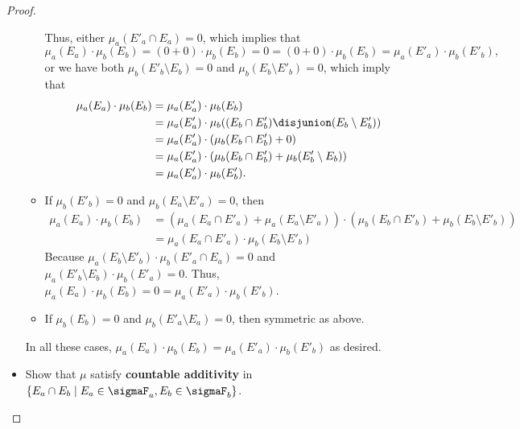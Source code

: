 \documentclass[acmsmall,nonacm,screen,appendix]{acmart}
\begin{document}
\begin{proof}
\begin{itemize}
\begin{itemize}
       Thus,  either $\mu_a(E'_a \cap E_a) = 0$, which implies that
       \[
        \mu_a(E_a) \cdot \mu_b(E_b)  = (0 + 0) \cdot  \mu_b(E_b) = 0 =(0+0) \cdot \mu_b(E_b) = \mu_a(E'_a) \cdot \mu_b(E'_b),
       \]
       or we have both $\mu_b(E'_b \setminus E_b) = 0$ and $\mu_b(E_b \setminus E'_b) = 0$, which imply that
       \begin{align*}
        \mu_a(E_a) \cdot \mu_b(E_b)
          &= \mu_a(E'_a) \cdot \mu_b(E_b)\\
          &= \mu_a(E'_a) \cdot \mu_b((E_b \cap E'_b ) \disjunion (E_b \setminus E'_b)) \\
          &= \mu_a(E'_a) \cdot (\mu_b(E_b \cap E'_b ) + 0) \\
          &= \mu_a(E'_a) \cdot (\mu_b(E_b \cap E'_b ) + \mu_b(E'_b \setminus E_b)) \\
          &= \mu_a(E'_a) \cdot \mu_b(E'_b ).
       \end{align*}
       \item If $\mu_b(E'_b) = 0$ and $\mu_b(E_a \setminus E'_a) = 0$,
        then
        \begin{align*}
         \mu_a(E_a) \cdot \mu_b(E_b)
         &= (\mu_a(E_a \cap E'_a) + \mu_a(E_a \setminus E'_a)) \cdot (\mu_b(E_b \cap E'_b) + \mu_b(E_b \setminus E'_b)) \\
         &= \mu_a(E_a \cap E'_a)  \cdot \mu_b(E_b \setminus E'_b)
        \end{align*}
Because $\mu_a(E_b \setminus E'_b) \cdot \mu_b(E'_a \cap E_a) = 0$ and
     $\mu_a(E'_b \setminus E_b) \cdot \mu_b(E'_a) = 0$.
        Thus, $\mu_a(E_a) \cdot \mu_b(E_b) =0 = \mu_a(E'_a) \cdot \mu_b(E'_b)$.

       \item If $\mu_b(E_b) = 0$ and $\mu_b(E'_a \setminus E_a) = 0$,
        then symmetric as above.

     \end{itemize}

     In all these cases,
     $\mu_a(E_a) \cdot \mu_b(E_b) = \mu_a(E'_a) \cdot \mu_b(E'_b)$ as desired.

    \item Show that $\mu$ satisfy \textbf{countable additivity} in $\{E_a \cap E_b \mid E_a \in \sigmaF_a,
   E_b \in  \sigmaF_b\}$.


\end{itemize}
\end{proof}
\end{document}
